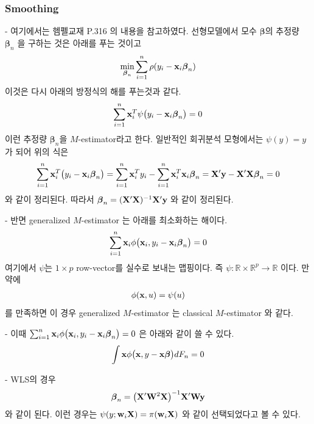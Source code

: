 \documentclass[preprint, review, 12pt]{article}
\theoremstyle{definition}
\theoremstyle{remark}
\begin{document}
\subsubsection*{Smoothing}
- 여기에서는 헴펠교재 P.316 의 내용을 참고하였다. 선형모델에서 모수 $\boldsymbol{\beta}$의 추정량 $\boldsymbol{\beta}_ n$ 을 구하는 것은 아래를 푸는 것이고 
\begin{align}
\min_{\boldsymbol{\beta}_ n}\sum_{i=1}^{n}\rho(y_i-{\bf x}_ i \boldsymbol{\beta}_ n)
\end{align}
이것은 다시 아래의 방정식의 해를 푸는것과 같다. 
\begin{align}
\sum_{i=1}^{n}{\bf x}_ i^T\psi\big(y_i-{\bf x}_ i \boldsymbol{\beta}_ n\big)=0 
\end{align}
이런 추정량 $\boldsymbol{\beta}_ n$을 $M$-estimator라고 한다. 일반적인 회귀분석 모형에서는 $\psi(y)=y$ 가 되어 위의 식은 
\begin{align}
\sum_{i=1}^{n}{\bf x}_ i^T\big(y_i-{\bf x}_ i \boldsymbol{\beta}_ n\big)=\sum_{i=1}^{n}{\bf x}_ i^T y_i-\sum_{i=1}^{n}{\bf x}_ i^T {\bf x}_ i \boldsymbol{\beta}_ n= {\bf X}'{\bf y}-{\bf X}'{\bf X}\boldsymbol{\beta}_ n=0 
\end{align}
와 같이 정리된다. 따라서 $\boldsymbol{\beta}_ n = ({\bf X}'{\bf X})^{-1}{\bf X}'{\bf y}$ 와 같이 정리된다.

- 반면 generalized $M$-estimator 는 아래를 최소화하는 해이다. 
\begin{align}
\sum_{i=1}^{n}{\bf x}_ i \phi\big({\bf x}_ i , y_i-{\bf x}_ i \boldsymbol{\beta}_ n\big) =0 
\end{align}
여기에서 $\psi$는 $1\times p$ row-vector를 실수로 보내는 맵핑이다. 즉 $\psi:\mathbb{R}\times \mathbb{R}^p \to \mathbb{R}$ 이다. 만약에 
\begin{align}
\phi({\bf x},u)=\psi(u)
\end{align}
를 만족하면 이 경우 generalized $M$-estimator 는 classical $M$-estimator 와 같다. 

- 이때 $\sum_{i=1}^{n}{\bf x}_ i \phi\big({\bf x}_ i , y_i-{\bf x}_ i \boldsymbol{\beta}_ n\big) =0$ 은 아래와 같이 쓸 수 있다. 
\begin{align}
\int {\bf x} \phi\big({\bf x} , y-{\bf x} \boldsymbol{\beta}\big) dF_n=0 
\end{align}

- WLS의 경우 
\begin{align}
\boldsymbol{\beta}_ n = \big({\bf X}'{\bf W}^2{\bf X}\big)^{-1}{\bf X}'{\bf W}{\bf y}
\end{align}
와 같이 된다. 이런 경우는 $\psi(y;{\bf w}_ i {\bf X})= \pi({\bf w}_ i {\bf X}) $ 와 같이 선택되었다고 볼 수 있다. 
\end{document}

